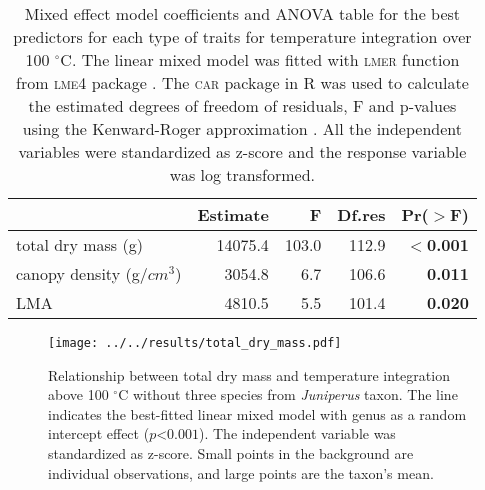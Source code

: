\documentclass{bmcart}
\newcommand{\pkg}[1]{\textsc{#1}}
\begin{document}
\begin{table}
\centering
\caption{Mixed effect model coefficients and ANOVA table for the best predictors for each type of traits for temperature integration over 100 $^{\circ}$C. The linear mixed model was fitted with \pkg{lmer} function from \pkg{lme4} package \citep{bates2009package}. The \pkg{car} package in R \citep{fox2013hypothesis} was used to calculate the estimated degrees of freedom of residuals, F and p-values using the Kenward-Roger approximation \citep{kenward1997small}. All the independent variables were standardized  as z-score and the response variable was log transformed.}
\vspace{0.5 cm}
\begin{tabular}{lrrrr}
  \hline
 &  Estimate & F  & Df.res & Pr($>$F) \\ 
  \hline 
  total dry mass (g) & 14075.4 & 103.0  & 112.9 & \textbf{$<$0.001} \\ 
  canopy density (g/{$cm^3$}) & 3054.8 & 6.7  & 106.6 & \textbf{0.011} \\ 
  LMA & 4810.5 & 5.5 &  101.4 & \textbf{0.020} \\ 
   \hline
\end{tabular}
\label{tab:fandpstatfortemp}
\end{table}

\begin{figure}[ht]
    \centering
    \texttt{[image: ../../results/total\_dry\_mass.pdf]}
    \caption[Dry mass effect on temperature integration]{\label{fig:dm-tempint}Relationship between total dry mass and temperature integration above 100 $^{\circ}$C without three species from \emph{Juniperus} taxon. The line indicates the best-fitted linear mixed model with genus as a random intercept effect ($p $<$ 0.001$). The independent variable was standardized as z-score. Small points in the background are individual observations, and large points are the taxon's mean.}
\end{figure}
\end{document}
